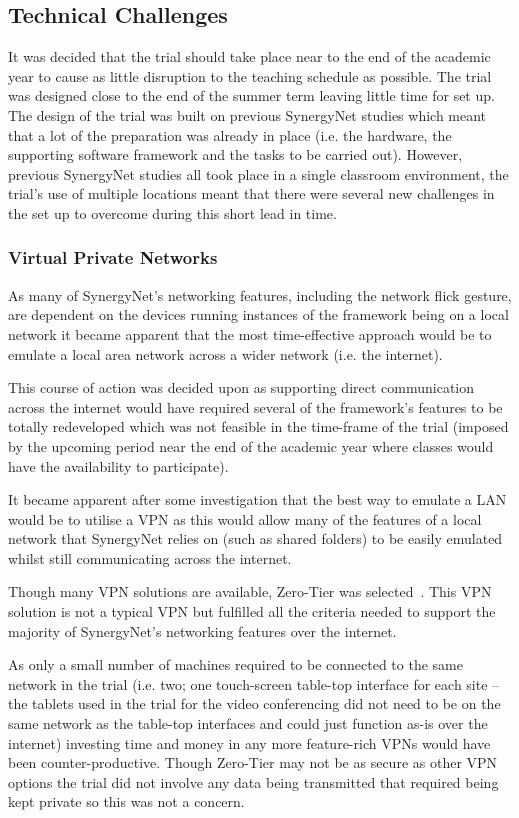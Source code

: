 \documentclass[a4paper,11pt]{article}
\begin{document}
\subsection{Technical Challenges}

It was decided that the trial should take place near to the end of the academic year to cause as little disruption to the teaching schedule as possible.
The trial was designed close to the end of the summer term leaving little time for set up.
The design of the trial was built on previous SynergyNet studies which meant that a lot of the preparation was already in place (i.e. the hardware, the supporting software framework and the tasks to be carried out).
However, previous SynergyNet studies all took place in a single classroom environment, the trial's use of multiple locations meant that there were several new challenges in the set up to overcome during this short lead in time.

\subsubsection{Virtual Private Networks}

As many of SynergyNet’s networking features, including the network flick gesture, are dependent on the devices running instances of the framework being on a local network it became apparent that the most time-effective approach would be to emulate a local area network across a wider network (i.e. the internet).

This course of action was decided upon as supporting direct communication across the internet would have required several of the framework’s features to be totally redeveloped which was not feasible in the time-frame of the trial (imposed by the upcoming period near the end of the academic year where classes would have the availability to participate).

It became apparent after some investigation that the best way to emulate a LAN would be to utilise a VPN as this would allow many of the features of a local network that SynergyNet relies on (such as shared folders) to be easily emulated whilst still communicating across the internet.

Though many VPN solutions are available, Zero-Tier was selected~\cite{zerotier:2016}.
This VPN solution is not a typical VPN but fulfilled all the criteria needed to support the majority of SynergyNet’s networking features over the internet.

As only a small number of machines required to be connected to the same network in the trial (i.e. two; one touch-screen table-top interface for each site – the tablets used in the trial for the video conferencing did not need to be on the same network as the table-top interfaces and could just function as-is over the internet) investing time and money in any more feature-rich VPNs would have been counter-productive.
Though Zero-Tier may not be as secure as other VPN options the trial did not involve any data being transmitted that required being kept private so this was not a concern.
\end{document}
